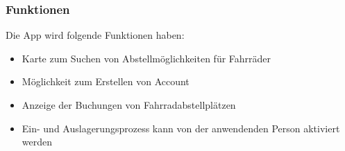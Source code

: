 \subsubsection{Funktionen}
Die App wird folgende Funktionen haben:
\begin{itemize}
    \item Karte zum Suchen von Abstellmöglichkeiten für Fahrräder
    \item Möglichkeit zum Erstellen von Account
    \item Anzeige der Buchungen von Fahrradabstellplätzen
    \item Ein- und Auslagerungsprozess kann von der anwendenden Person aktiviert werden
\end{itemize}